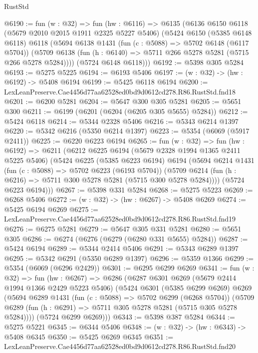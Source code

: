 \begin{lexlean}{RustStd}
\begin{coremodule}
@6190 := fun (w : @32) =>
  fun (hw : @6116) =>
  @6135
    (@6136
      @6150
      @6118
      (@5679 @2010 @2015 @1911 @2325 @5227 @5406)
      (@5424
        @6150
        (@5385 @6148 @6118)
        @6118
        (@5694
          @6138
          @1431
          (fun (c : @5088) => @5702 @6148 (@6117 @5704))
          (@5709 @6138 (fun (h : @6140) => @5711 @266 @5278 @5281 (@5715 @266 @5278 @5284))))
        (@5724 @6148 @6118)))
@6192 := @5398 @305 @5284
@6193 := @5275 @5225
@6194 := @6193 @5406
@6197 := (w : @32) -> (hw : @6192) -> @5408 @6194
@6199 := @5425 @6118 @6194
@6200 := LexLeanPreserve.Cae4456d77aa62528ed0bd9d0612cd278.R86.RustStd.fnd18
@6201 := @6200 @5281
@6204 := @5647 @300 @305 @5281
@6205 := @5651 @300
@6211 := @6199 (@6201 (@6204 (@6205 @305 @5655) @5284))
@6212 := @5424 @6118
@6214 := @5344 @2328 @5406
@6216 := @5343 @6214 @1397
@6220 := @5342 @6216 (@5350 @6214 @1397)
@6223 := @5354 (@6069 (@5917 @2411))
@6225 := @6220 @6223 @6194
@6265 := fun (w : @32) =>
  fun (hw : @6192) =>
  @6211
    (@6212
      @6225
      @6194
      (@5679 @2328 @1994 @1365 @2411 @5225 @5406)
      (@5424
        @6225
        (@5385 @6223 @6194)
        @6194
        (@5694
          @6214
          @1431
          (fun (c : @5088) => @5702 @6223 (@6193 @5704))
          (@5709 @6214 (fun (h : @6216) => @5711 @300 @5278 @5281 (@5715 @300 @5278 @5284))))
        (@5724 @6223 @6194)))
@6267 := @5398 @331 @5284
@6268 := @5275 @5223
@6269 := @6268 @5406
@6272 := (w : @32) -> (hw : @6267) -> @5408 @6269
@6274 := @5425 @6194 @6269
@6275 := LexLeanPreserve.Cae4456d77aa62528ed0bd9d0612cd278.R86.RustStd.fnd19
@6276 := @6275 @5281
@6279 := @5647 @305 @331 @5281
@6280 := @5651 @305
@6286 := @6274 (@6276 (@6279 (@6280 @331 @5655) @5284))
@6287 := @5424 @6194
@6289 := @5344 @2414 @5406
@6291 := @5343 @6289 @1397
@6295 := @5342 @6291 (@5350 @6289 @1397)
@6296 := @5359 @1366
@6299 := @5354 (@6069 (@6296 @2429))
@6301 := @6295 @6299 @6269
@6341 := fun (w : @32) =>
  fun (hw : @6267) =>
  @6286
    (@6287
      @6301
      @6269
      (@5679 @2414 @1994 @1366 @2429 @5223 @5406)
      (@5424
        @6301
        (@5385 @6299 @6269)
        @6269
        (@5694
          @6289
          @1431
          (fun (c : @5088) => @5702 @6299 (@6268 @5704))
          (@5709 @6289 (fun (h : @6291) => @5711 @305 @5278 @5281 (@5715 @305 @5278 @5284))))
        (@5724 @6299 @6269)))
@6343 := @5398 @387 @5284
@6344 := @5275 @5221
@6345 := @6344 @5406
@6348 := (w : @32) -> (hw : @6343) -> @5408 @6345
@6350 := @5425 @6269 @6345
@6351 := LexLeanPreserve.Cae4456d77aa62528ed0bd9d0612cd278.R86.RustStd.fnd20

\end{coremodule}
\end{lexlean}
